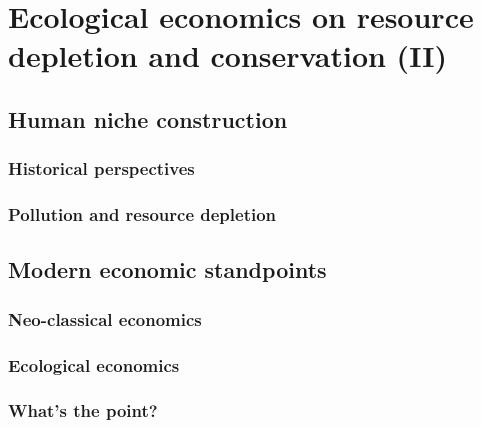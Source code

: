 \chapter{Ecological economics on resource depletion and conservation (II)}

\lipsum[34]

\section{Human niche construction}
\subsection{Historical perspectives}
\subsection{Pollution and resource depletion}

\section{Modern economic standpoints}
\subsection{Neo-classical economics}
\subsection{Ecological economics}
\subsection{What's the point?}
